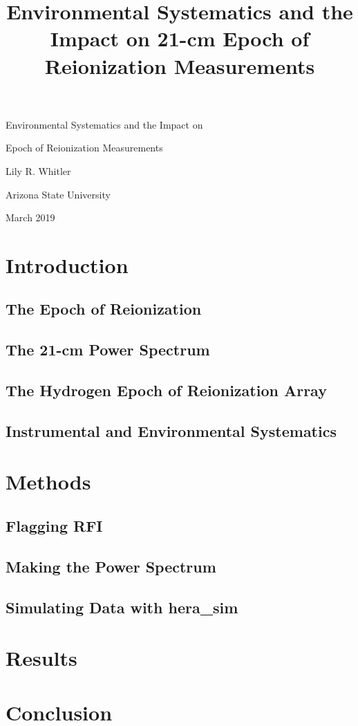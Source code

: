\documentclass[12pt]{article}
\title{Environmental Systematics and the Impact on 21-cm Epoch of Reionization Measurements}
\newcommand{\code}[1]{{\fontfamily{qcr}\selectfont#1}}
\begin{document}
\vspace*{0.25\textheight}
\begin{center}
{\Large Environmental Systematics and the Impact on \par\vspace{0.15\baselineskip} Epoch of Reionization Measurements}
\end{center}
\begin{center}
Lily R. Whitler \par
Arizona State University \par
March 2019 \par
\end{center}

\newpage
\begin{abstract}
\end{abstract}

\section{Introduction}
\subsection{The Epoch of Reionization}
\citep{furlanetto2006}
\subsection{The 21-cm Power Spectrum}
\subsection{The Hydrogen Epoch of Reionization Array}
\subsection{Instrumental and Environmental Systematics}

\section{Methods}
\subsection{Flagging RFI}
\subsection{Making the Power Spectrum}
\subsection{Simulating Data with \code{hera{\_}sim}}

\section{Results}
\section{Conclusion}

\end{document}
